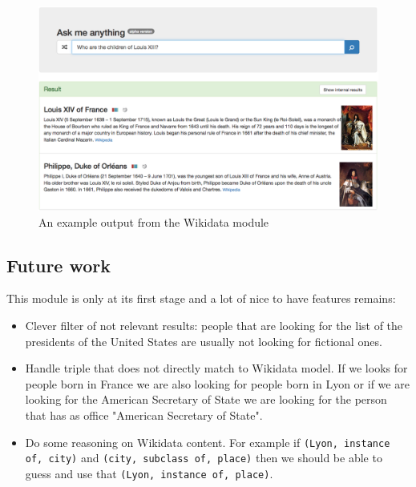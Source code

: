 \begin{figure}[!h]
  \centering
    \label{wikidata:struct}
    \includegraphics[width=\textwidth]{./wikidata_louis13_children.png}
    \caption{An example output from the Wikidata module}
\end{figure}

\subsection{Future work}

This module is only at its first stage and a lot of nice to have features remains:
\begin{itemize}
    \item Clever filter of not relevant results: people that are looking for the list of the presidents of the United States are usually not looking for fictional ones.
    \item Handle triple that does not directly match to Wikidata model. If we looks for people born in France we are also looking for people born in Lyon or if we are looking for the American Secretary of State we are looking for the person that has as office "American Secretary of State".
    \item Do some reasoning on Wikidata content. For example if \texttt{(Lyon, instance of, city)} and \texttt{(city, subclass of, place)} then we should be able to guess and use that \texttt{(Lyon, instance of, place)}.
\end{itemize}
